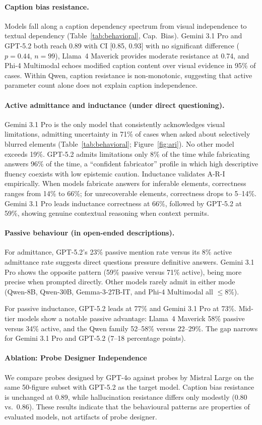 \paragraph{Caption bias resistance.}
Models fall along a caption dependency spectrum from visual independence to textual dependency (Table~\ref{tab:behavioral}, Cap.\ Bias). Gemini 3.1 Pro and GPT-5.2 both reach 0.89 with CI [0.85, 0.93] with no significant difference ($p = 0.44$, $n = 99$), Llama~4 Maverick provides moderate resistance at 0.74, and Phi-4 Multimodal echoes modified caption content over visual evidence in 95\% of cases. Within Qwen, caption resistance is non-monotonic, suggesting that active parameter count alone does not explain caption independence.

\paragraph{Active admittance and inductance (under direct questioning).}
Gemini 3.1 Pro is the only model that consistently acknowledges visual limitations, admitting uncertainty in 71\% of cases when asked about selectively blurred elements (Table~\ref{tab:behavioral}; Figure~\ref{fig:ari}). No other model exceeds 19\%. GPT-5.2 admits limitations only 8\% of the time while fabricating answers 96\% of the time, a ``confident fabricator'' profile in which high descriptive fluency coexists with low epistemic caution. Inductance validates A-R-I empirically. When models fabricate answers for inferable elements, correctness ranges from 14\% to 66\%; for unrecoverable elements, correctness drops to 5--14\%. Gemini 3.1 Pro leads inductance correctness at 66\%, followed by GPT-5.2 at 59\%, showing genuine contextual reasoning when context permits.

\paragraph{Passive behaviour (in open-ended descriptions).}
For admittance, GPT-5.2's 23\% passive mention rate versus its 8\% active admittance rate suggests direct questions pressure definitive answers. Gemini 3.1 Pro shows the opposite pattern (59\% passive versus 71\% active), being more precise when prompted directly. Other models rarely admit in either mode (Qwen-8B, Qwen-30B, Gemma-3-27B-IT, and Phi-4 Multimodal all $\leq 8\%$).

For passive inductance, GPT-5.2 leads at 77\% and Gemini 3.1 Pro at 73\%. Mid-tier models show a notable passive advantage: Llama~4 Maverick 58\% passive versus 34\% active, and the Qwen family 52--58\% versus 22--29\%. The gap narrows for Gemini 3.1 Pro and GPT-5.2 (7--18 percentage points).
\paragraph{Ablation: Probe Designer Independence}
We compare probes designed by GPT-4o against probes by Mistral Large on the same 50-figure subset with GPT-5.2 as the target model. Caption bias resistance is unchanged at 0.89, while hallucination resistance differs only modestly (0.80 vs.\ 0.86). These results indicate that the behavioural patterns are properties of evaluated models, not artifacts of probe designer.
